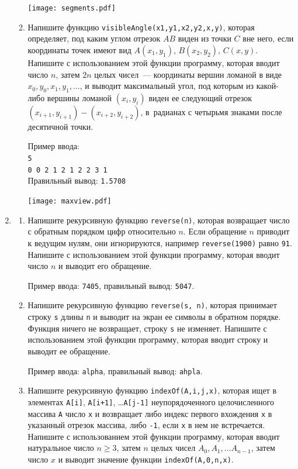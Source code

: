 \documentclass{article}
\newcommand{\textex}[1]{\texttt{\color{ForestGreen}#1}}
\begin{document}
\begin{enumerate}[label={}, leftmargin=0pt, itemindent=0pt]
\begin{enumerate}[label=\arabic{enumi}.\arabic*.]
\vskip-1.7cm\strut\hfill\texttt{[image: segments.pdf]}

\item
Напишите функцию \texttt{visibleAngle(x1,y1,x2,y2,x,y)}, которая определяет, под каким углом отрезок $AB$ виден из точки $C$ вне него, если координаты точек имеют вид $A(x_1, y_1)$, $B(x_2,y_2)$, $C(x,y)$. Напишите с использованием этой функции программу, которая вводит число $n$, затем $2n$ целых чисел~--- координаты вершин ломаной в виде $x_0, y_0, x_1, y_1,\ldots$, и выводит максимальный угол, под которым из какой-либо вершины ломаной $(x_i,y_i)$ виден ее следующий отрезок $(x_{i+1},y_{i+1})-(x_{i+2},y_{i+2})$, в~радианах с четырьмя знаками после десятичной точки.

\noindent
Пример ввода: \\
\textex{5\\
0 0 2 1 2 1 2 2 3 1}\\
Правильный вывод: \textex{1.5708}

\vskip-1.7cm\strut\hfill\texttt{[image: maxview.pdf]}
\end{enumerate}


\medskip\hrulefill\medskip

\item 

\begin{enumerate}[label=\arabic{enumi}.\arabic*.] %
\item
Напишите рекурсивную функцию \texttt{reverse(n)}, которая возвращает число с обратным порядком цифр относительно $n$. Если обращение $n$ приводит к ведущим нулям, они игнорируются, например \texttt{reverse(\textex{1900})} равно \textex{91}. Напишите с использованием этой функции программу, которая вводит число $n$ и выводит его обращение.

\noindent Пример ввода: \textex{7405}, правильный вывод: \textex{5047}.
\item
Напишите рекурсивную функцию \texttt{reverse(s, n)}, которая принимает строку \texttt{s} длины \texttt{n} и выводит на экран ее символы в обратном порядке. Функция ничего не возвращает, строку \texttt{s} не изменяет. Напишите с использованием этой функции программу, которая вводит строку и выводит ее обращение.

\noindent Пример ввода: \textex{alpha}, правильный вывод: \textex{ahpla}.

\item
Напишите рекурсивную функцию \texttt{indexOf(A,i,j,x)}, которая ищет в элементах \texttt{A[i]}, \texttt{A[i+1]}, \ldots \texttt{A[j-1]} неупорядоченного целочисленного массива \texttt{A} число \texttt{x} и возвращает либо индекс первого вхождения \texttt{x} в указанный отрезок массива, либо \texttt{-1}, если \texttt{x} в нем не встречается. Напишите с использованием этой функции программу, которая вводит натуральное число $n\geqslant 3$, затем $n$ целых чисел $A_0, A_1, \ldots A_{n-1}$, затем число $x$ и выводит значение функции \texttt{indexOf(A,0,n,x)}.


\end{enumerate}
\end{enumerate}
\end{document}
